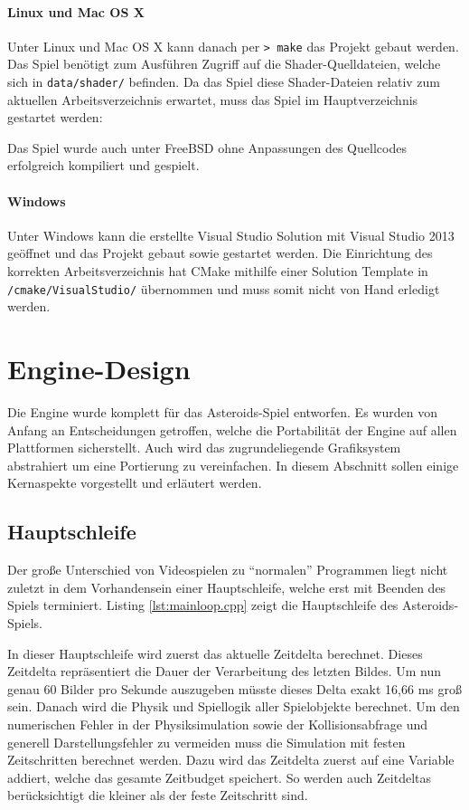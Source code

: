 \documentclass[12pt, a4paper, titlepage, hidelinks]{scrreprt}
\begin{document}
\paragraph{Linux und Mac OS X}
Unter Linux und Mac OS X kann danach per \texttt{>~make} das Projekt gebaut werden. Das Spiel benötigt zum Ausführen Zugriff auf die Shader-Quelldateien, welche sich in \texttt{data/shader/} befinden. Da das Spiel diese Shader-Dateien relativ zum aktuellen Arbeitsverzeichnis erwartet, muss das Spiel im Hauptverzeichnis gestartet werden:

Das Spiel wurde auch unter FreeBSD ohne Anpassungen des Quellcodes erfolgreich kompiliert und gespielt.

\paragraph{Windows}
Unter Windows kann die erstellte Visual Studio Solution mit Visual Studio 2013 geöffnet und das Projekt gebaut sowie gestartet werden. Die Einrichtung des korrekten Arbeitsverzeichnis hat CMake mithilfe einer Solution Template in \texttt{/cmake/VisualStudio/} übernommen und muss somit nicht von Hand erledigt werden.

\section{Engine-Design}

Die Engine wurde komplett für das Asteroids-Spiel entworfen. Es wurden von Anfang an Entscheidungen getroffen, welche die Portabilität der Engine auf allen Plattformen sicherstellt. Auch wird das zugrundeliegende Grafiksystem abstrahiert um eine Portierung zu vereinfachen. In diesem Abschnitt sollen einige Kernaspekte vorgestellt und erläutert werden. 

\subsection{Hauptschleife}

Der große Unterschied von Videospielen zu ``normalen'' Programmen liegt nicht zuletzt in dem Vorhandensein einer Hauptschleife, welche erst mit Beenden des Spiels terminiert. Listing \autoref{lst:mainloop.cpp} zeigt die Hauptschleife des Asteroids-Spiels.

In dieser Hauptschleife wird zuerst das aktuelle Zeitdelta berechnet. Dieses Zeitdelta repräsentiert die Dauer der Verarbeitung des letzten Bildes. Um nun genau 60 Bilder pro Sekunde auszugeben müsste dieses Delta exakt 16,66 ms groß sein. Danach wird die Physik und Spiellogik aller Spielobjekte berechnet. Um den numerischen Fehler in der Physiksimulation sowie der Kollisionsabfrage und generell Darstellungsfehler zu vermeiden muss die Simulation mit festen Zeitschritten berechnet werden. Dazu wird das Zeitdelta zuerst auf eine Variable addiert, welche das gesamte Zeitbudget speichert. So werden auch Zeitdeltas berücksichtigt die kleiner als der feste Zeitschritt sind.
\end{document}
